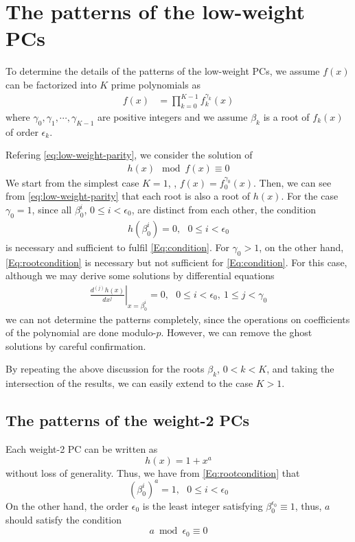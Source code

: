 \section{The patterns of the low-weight PCs}
\label{sec3}
To determine the details of the patterns of the low-weight PCs, we assume $f(x)$ can be factorized into $K$ prime polynomials as 
\begin{align}
f(x)&=\prod_{k=0}^{K-1}f_k^{\gamma_k}(x)
\end{align}
where $\gamma_0,\gamma_1,\cdots,\gamma_{K-1}$ are positive integers and we assume $\beta_k$ is a root of $f_{k}(x)$ of order $\epsilon_k$.

Refering \eqref{eq:low-weight-parity}, we consider the solution of
\begin{align}
	h(x) \mod f(x) \equiv 0
	\label{Eq:condition}
\end{align}
%
We start from the simplest case $K=1$, \ie, $f(x) = f_0^{\gamma_0}(x)$. Then, we can see from \eqref{eq:low-weight-parity} that each root is also a root of $h(x)$. For the case $\gamma_0 = 1$, since all $\beta_0^i$, $0 \leq i < \epsilon_0$, are distinct from each other, the condition
\begin{align}
	h(\beta_0^i)=0,~~~ 0 \leq i < \epsilon_0
	\label{Eq:rootcondition}
\end{align}
is necessary and sufficient to fulfil \eqref{Eq:condition}. For $\gamma_0 > 1$, on the other hand, \eqref{Eq:rootcondition} is necessary but not sufficient for \eqref{Eq:condition}. For this case, although we may derive some solutions by differential equations
\begin{align}
\left.\frac{d^{(j)}h(x)}{d x^j}\right|_{x=\beta_0^i}=0,~~~0 \leq i < \epsilon_0,~1 \leq j < \gamma_0
\label{Eq:differential}
\end{align}
we can not determine the patterns completely, since the operations on coefficients of the polynomial are done modulo-$p$. However, we can remove the ghost solutions 
by careful confirmation.

By repeating the above discussion for the roots $\beta_k$, $0 < k < K$, and taking the intersection of the results, we can easily extend to the case $K>1$.

\subsection{The patterns of the weight-2 PCs}
\label{sec:PC2}
Each weight-2 PC can be written as 
\begin{equation}
h(x)=1+x^a
\label{eq:wt2-gen-form}
\end{equation}
without loss of generality. Thus, we have from \eqref{Eq:rootcondition} that
\begin{equation}
(\beta_0^i)^a =1,~~~ 0 \leq i < \epsilon_0
\label{novelEq5b}
\end{equation}
On the other hand, the order $\epsilon_0$ is the least integer satisfying $\beta_0^{\epsilon_0} \equiv 1$, thus, $a$ should satisfy the condition
$$a \bmod \epsilon_0  \equiv 0$$


